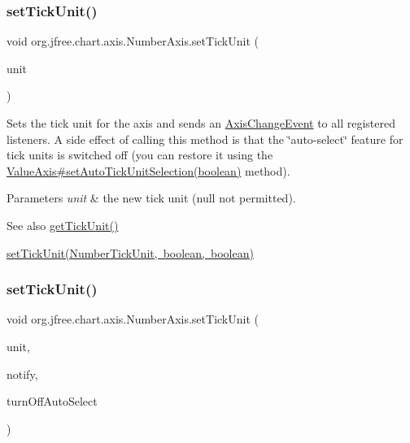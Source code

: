 \subsubsection{\texorpdfstring{set\+Tick\+Unit()}{setTickUnit()}\hspace{0.1cm}{\footnotesize\ttfamily [1/2]}}
{\footnotesize\ttfamily void org.\+jfree.\+chart.\+axis.\+Number\+Axis.\+set\+Tick\+Unit (\begin{DoxyParamCaption}\item[{\mbox{\hyperlink{classorg_1_1jfree_1_1chart_1_1axis_1_1_number_tick_unit}{Number\+Tick\+Unit}}}]{unit }\end{DoxyParamCaption})}

Sets the tick unit for the axis and sends an \mbox{\hyperlink{}{Axis\+Change\+Event}} to all registered listeners. A side effect of calling this method is that the \char`\"{}auto-\/select\char`\"{} feature for tick units is switched off (you can restore it using the \mbox{\hyperlink{classorg_1_1jfree_1_1chart_1_1axis_1_1_value_axis_a7366393f75b07420136f449d351deb08}{Value\+Axis\#set\+Auto\+Tick\+Unit\+Selection(boolean)}} method).


\begin{DoxyParams}{Parameters}
{\em unit} & the new tick unit ({\ttfamily null} not permitted).\\
\hline
\end{DoxyParams}
\begin{DoxySeeAlso}{See also}
\mbox{\hyperlink{classorg_1_1jfree_1_1chart_1_1axis_1_1_number_axis_a17a75a59f3d3b8eff0d53c717bfb3b13}{get\+Tick\+Unit()}} 

\mbox{\hyperlink{classorg_1_1jfree_1_1chart_1_1axis_1_1_number_axis_aec957791ea678580712a475bc75ea65d}{set\+Tick\+Unit(\+Number\+Tick\+Unit, boolean, boolean)}} 
\end{DoxySeeAlso}
\mbox{\label{classorg_1_1jfree_1_1chart_1_1axis_1_1_number_axis_aec957791ea678580712a475bc75ea65d}} 
\subsubsection{\texorpdfstring{set\+Tick\+Unit()}{setTickUnit()}\hspace{0.1cm}{\footnotesize\ttfamily [2/2]}}
{\footnotesize\ttfamily void org.\+jfree.\+chart.\+axis.\+Number\+Axis.\+set\+Tick\+Unit (\begin{DoxyParamCaption}\item[{\mbox{\hyperlink{classorg_1_1jfree_1_1chart_1_1axis_1_1_number_tick_unit}{Number\+Tick\+Unit}}}]{unit,  }\item[{boolean}]{notify,  }\item[{boolean}]{turn\+Off\+Auto\+Select }\end{DoxyParamCaption})}

